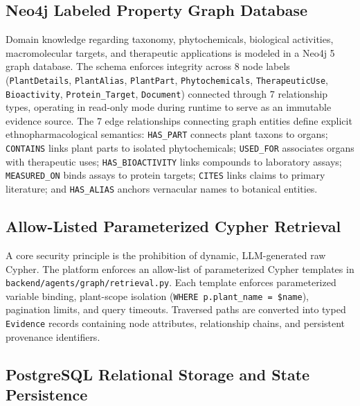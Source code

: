 \subsection{Neo4j Labeled Property Graph Database}

Domain knowledge regarding taxonomy, phytochemicals, biological activities, macromolecular targets, and therapeutic applications is modeled in a Neo4j 5 graph database. The schema enforces integrity across 8 node labels (\texttt{PlantDetails}, \texttt{PlantAlias}, \texttt{PlantPart}, \texttt{Phytochemicals}, \texttt{TherapeuticUse}, \texttt{Bioactivity}, \texttt{Protein\_Target}, \texttt{Document}) connected through 7 relationship types, operating in read-only mode during runtime to serve as an immutable evidence source. The 7 edge relationships connecting graph entities define explicit ethnopharmacological semantics: \texttt{HAS\_PART} connects plant taxons to organs; \texttt{CONTAINS} links plant parts to isolated phytochemicals; \texttt{USED\_FOR} associates organs with therapeutic uses; \texttt{HAS\_BIOACTIVITY} links compounds to laboratory assays; \texttt{MEASURED\_ON} binds assays to protein targets; \texttt{CITES} links claims to primary literature; and \texttt{HAS\_ALIAS} anchors vernacular names to botanical entities.

\subsection{Allow-Listed Parameterized Cypher Retrieval}

A core security principle is the prohibition of dynamic, LLM-generated raw Cypher. The platform enforces an allow-list of parameterized Cypher templates in \texttt{backend/\allowbreak agents/\allowbreak graph/\allowbreak retrieval.py}. Each template enforces parameterized variable binding, plant-scope isolation (\texttt{WHERE p.plant\_name = \$name}), pagination limits, and query timeouts. Traversed paths are converted into typed \texttt{Evidence} records containing node attributes, relationship chains, and persistent provenance identifiers.

\subsection{PostgreSQL Relational Storage and State Persistence}

